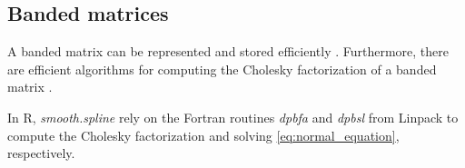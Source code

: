 \documentclass[a4paper]{scrartcl}
\begin{document}
\subsection{Banded matrices}

A banded matrix can be represented and stored efficiently \cite[Section 1.2.5]{Golub:van_Loan:2013}.
Furthermore, there are efficient algorithms for computing the Cholesky factorization of a banded matrix \cite[Section 4.3]{Golub:van_Loan:2013}.

In R, \textit{smooth.spline} rely on the Fortran routines \textit{dpbfa} and \textit{dpbsl} from Linpack \cite{Dongarra:Moler:Bunch:Stewart:1979} to compute the Cholesky factorization and solving \cref{eq:normal_equation}, respectively.


\printbibliography
\end{document}
